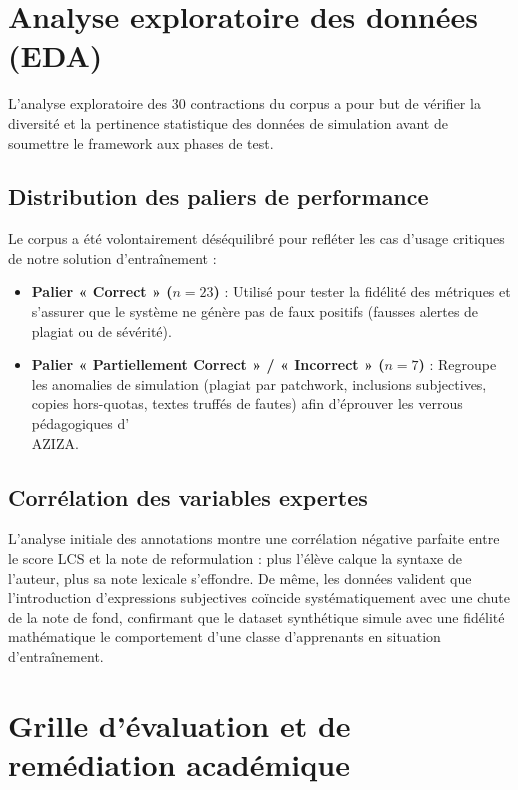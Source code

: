 \section{Analyse exploratoire des données (EDA)}

L'analyse exploratoire des 30 contractions du corpus a pour but de vérifier la diversité et la pertinence statistique des données de simulation avant de soumettre le framework aux phases de test.

\subsection{Distribution des paliers de performance}

Le corpus a été volontairement déséquilibré pour refléter les cas d'usage critiques de notre solution d'entraînement :

\begin{itemize}
    \item \textbf{Palier « Correct » (\(n=23\))} : Utilisé pour tester la fidélité des métriques et s'assurer que le système ne génère pas de faux positifs (fausses alertes de plagiat ou de sévérité).
    \item \textbf{Palier « Partiellement Correct » / « Incorrect » (\(n=7\))} : Regroupe les anomalies de simulation (plagiat par patchwork, inclusions subjectives, copies hors-quotas, textes truffés de fautes) afin d'éprouver les verrous pédagogiques d'\\AZIZA.
\end{itemize}

\subsection{Corrélation des variables expertes}

L'analyse initiale des annotations montre une corrélation négative parfaite entre le score LCS et la note de reformulation : plus l'élève calque la syntaxe de l'auteur, plus sa note lexicale s'effondre. De même, les données valident que l'introduction d'expressions subjectives coïncide systématiquement avec une chute de la note de fond, confirmant que le dataset synthétique simule avec une fidélité mathématique le comportement d'une classe d'apprenants en situation d'entraînement.

\section{Grille d'évaluation et de remédiation académique}
\label{sec:grille}

